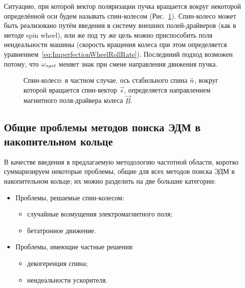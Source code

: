 Ситуацию, при которой вектор поляризации пучка вращается вокруг некоторой определённой оси 
будем называть спин-колесом (Рис.~\ref{fig:SpinWheel}). Спин-колесо может быть реализовано путём введения в систему 
внешних полей-драйверов (как в методе spin wheel), или же под ту же цель можно приспособить
 поля неидеальности машины (скорость вращения колеса при этом определяется
 уравнением~\eqref{eq:ImperfectionWheelRollRate}). 
Последниий подход возможен потому, что $\omega_{syst}$ меняет знак при смене направления движения
 пучка.~\cite[стр.~11]{BNL:Deuteron2008}
 
 \begin{figure}[h]\centering
{}
 	\caption{Спин-колесо: в частном случае, ось стабильного спина $\bar n$, вокруг которой вращается спин-вектор $\vec s$, определяется направлением магнитного поля-драйвера колеса $\vec B$.\label{fig:SpinWheel}}
 \end{figure}

\subsection{Общие проблемы методов поиска ЭДМ в накопительном кольце}\label{sec:FSSREDM:problems}
В качестве введения в предлагаемую методологию частотной области, коротко суммаризируем 
некоторые проблемы, общие для всех методов поиска ЭДМ в накопительном кольце; их можно
разделить на две большие категории:

\begin{itemize}
	\item Проблемы, решаемые спин-колесом:
	\begin{itemize}
		\item случайные возмущения электромагнитного поля;
		\item бетатронное движение.
	\end{itemize}
	\item Проблемы, имеющие частные решения:
	\begin{itemize}
		\item декогеренция спина;
		\item неидеальности ускорителя.
	\end{itemize}
\end{itemize}

